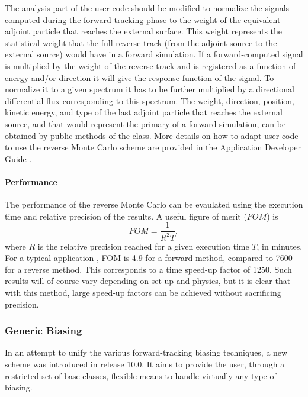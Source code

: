 The analysis part of the user code should be modified to normalize the signals
computed during the forward tracking phase to the weight of the equivalent
adjoint particle that reaches the external surface.  This weight represents the
statistical weight that the full reverse track (from the adjoint source to the 
external source) would have in a forward simulation.  If a forward-computed 
signal is multiplied by the weight of the reverse track and is registered as a
function of energy and/or direction it will give the response function of the 
signal.  To normalize it to a given spectrum it has to be further multiplied by
a directional differential flux corresponding to this spectrum.  The weight, 
direction, position, kinetic energy, and type of the last adjoint particle that
reaches the external source, and that would represent the primary of a forward
simulation, can be obtained by public methods of the 
class.  More details on how to adapt user code to use the reverse Monte Carlo 
scheme are provided in the Application Developer Guide \cite{bib:AppDevGuide}.

\paragraph{Performance}
The performance of the reverse Monte Carlo can be evaulated using the execution
time and relative precision of the results.  A useful figure of merit ($FOM$) is 
\begin{equation}
FOM = \frac{1}{R^2 T} , 
\end{equation}
where $R$ is the relative precision reached for a given execution time $T$, in
minutes.  For a typical application \cite{bib:revMC}, FOM is 4.9 for a forward
method, compared to 7600 for a reverse method.  This corresponds to a time 
speed-up factor of 1250.  Such results will of course vary depending on set-up
and physics, but it is clear that with this method, large speed-up factors can 
be achieved without sacrificing precision.    

\subsubsection{Generic Biasing}
In an attempt to unify the various forward-tracking biasing techniques, a new
scheme was introduced in release 10.0.  It aims to provide the user, through a
restricted set of base classes, flexible means to handle virtually any type
of biasing.

